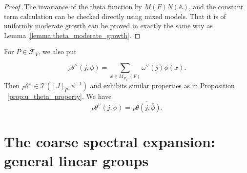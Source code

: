 \documentclass[letterpaper,11pt]{amsart}
\newcommand{\bA}{\mathbb{A}}
\newcommand{\cF}{\mathcal{F}}
\newcommand{\cT}{\mathcal{T}}
\newcommand{\<}{\negthickspace}
\theoremstyle{definition}
\theoremstyle{plain}
\theoremstyle{remark}
\numberwithin{equation}{section}
\begin{document}
\begin{proof}
The invariance of the theta function by $M(F)N(\bA)$, and the
constant term calculation can be checked directly using mixed models.
That it is of uniformly moderate growth can be proved in exactly the same way
as Lemma~\ref{lemma:theta_moderate_growth}.
\end{proof}

For $P \in \cF_V$, we also put

\begin{equation}
\label{eq:constant_term_theta}
      {}_P \theta^\vee(j,\phi) = \sum_{x \in M_{P_{L^\vee}}(F)} \omega^\vee(j) \phi(x).
\end{equation}
Then ${}_P \theta^\vee \in \cT([J]_P,\psi^{-1})$ and exhibits similar properties as in Proposition ~\ref{prop:u_theta_property}. We have
\[
    {}_P \theta^\vee(j,\phi) = \overline{{}_P \theta(j,\overline{\phi})}.
\]





\section{The coarse spectral expansion: general linear groups}
\end{document}
